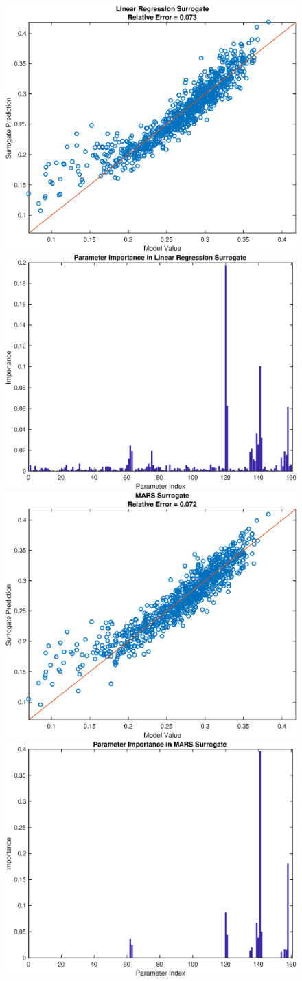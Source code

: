 \documentclass[12pt]{article}
\numberwithin{equation}{section}
\begin{document}
\begin{figure}[h]
\centering
\includegraphics[width=.49 \textwidth]{Figures/AM_AMp_Min_QoI_LR_Prediction_Rectangular.eps}
\includegraphics[width=.49 \textwidth]{Figures/AM_AMp_Min_QoI_LR_VI_Rectangular.eps}\\
\includegraphics[width=.49 \textwidth]{Figures/AM_AMp_Min_QoI_MARS_Prediction_Rectangular.eps}
\includegraphics[width=.49 \textwidth]{Figures/AM_AMp_Min_QoI_MARS_VI_Rectangular.eps}
\end{figure}
\end{document}
